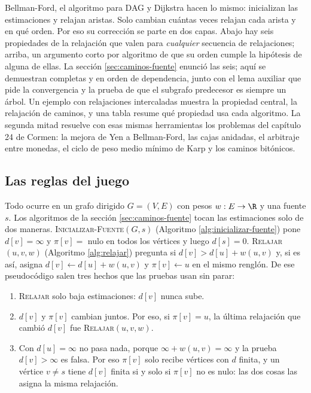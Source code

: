 \documentclass[11pt,letterpaper]{article}
\begin{document}
\begin{quick_sum}
  Bellman-Ford, el algoritmo para DAG y Dijkstra hacen lo mismo:
  inicializan las estimaciones y relajan aristas. Solo cambian
  cuántas veces relajan cada arista y en qué orden. Por eso su
  corrección se parte en dos capas. Abajo hay seis propiedades de la
  relajación que valen para \emph{cualquier} secuencia de
  relajaciones; arriba, un argumento corto por algoritmo de que su
  orden cumple la hipótesis de alguna de ellas. La sección
  \ref{sec:caminos-fuente} enunció las seis; aquí se demuestran
  completas y en orden de dependencia, junto con el lema auxiliar que
  pide la convergencia y la prueba de que el subgrafo predecesor es
  siempre un árbol. Un ejemplo con relajaciones intercaladas muestra
  la propiedad central, la relajación de caminos, y una tabla resume
  qué propiedad usa cada algoritmo. La segunda mitad resuelve con esas
  mismas herramientas los problemas del capítulo 24 de Cormen: la
  mejora de Yen a Bellman-Ford, las cajas anidadas, el arbitraje entre
  monedas, el ciclo de peso medio mínimo de Karp y los caminos
  bitónicos.
\end{quick_sum}


\subsection*{Las reglas del juego}

Todo ocurre en un grafo dirigido $G = (V, E)$ con pesos
$w : E \to \R$ y una fuente $s$. Los algoritmos de la sección
\ref{sec:caminos-fuente} tocan las estimaciones solo de dos maneras.
\textsc{Inicializar-Fuente}$(G, s)$ (Algoritmo
\ref{alg:inicializar-fuente}) pone $d[v] = \infty$ y $\pi[v] =$ nulo
en todos los vértices y luego $d[s] = 0$.
\textsc{Relajar}$(u, v, w)$ (Algoritmo \ref{alg:relajar}) pregunta si
$d[v] > d[u] + w(u, v)$ y, si es así, asigna
$d[v] \gets d[u] + w(u, v)$ y $\pi[v] \gets u$ en el mismo renglón. De
ese pseudocódigo salen tres hechos que las pruebas usan sin parar:
\begin{enumerate}[label=(\roman*)]
  \item \textsc{Relajar} solo baja estimaciones: $d[v]$ nunca sube.
  \item $d[v]$ y $\pi[v]$ cambian juntos. Por eso, si $\pi[v] = u$, la
    última relajación que cambió $d[v]$ fue
    \textsc{Relajar}$(u, v, w)$.
  \item Con $d[u] = \infty$ no pasa nada, porque
    $\infty + w(u, v) = \infty$ y la prueba $d[v] > \infty$ es falsa.
    Por eso $\pi[v]$ solo recibe vértices con $d$ finita, y un vértice
    $v \ne s$ tiene $d[v]$ finita si y solo si $\pi[v]$ no es nulo:
    las dos cosas las asigna la misma relajación.
\end{enumerate}
\end{document}

